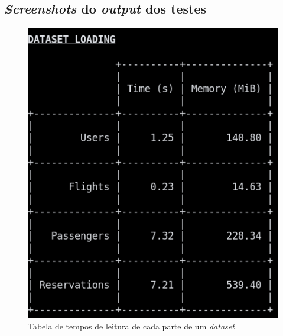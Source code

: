 \documentclass[11pt, a4paper]{article}
\begin{document}
\subsection{\emph{Screenshots} do \emph{output} dos testes}
\label{sec:testing-screenshots}

\begin{figure}[H]
    \centering
    \includegraphics[scale=0.4]{res-fase2/testing_screenshots/dataset.png}
    \caption{Tabela de tempos de leitura de cada parte de um \emph{dataset}}
    \label{fig:dataset-screenshot}
\end{figure}
\end{document}
